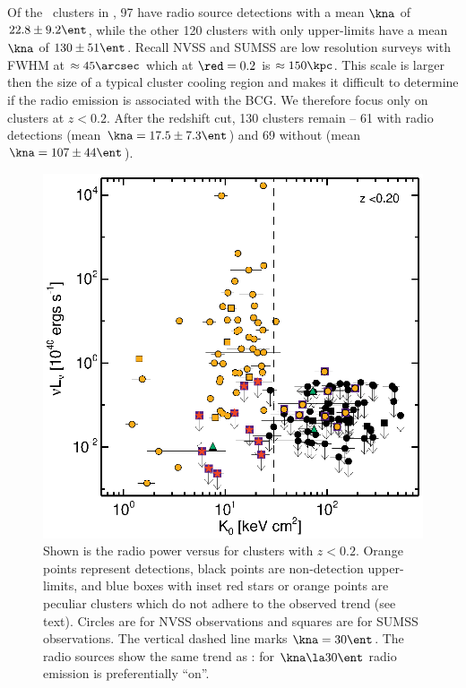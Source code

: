 \documentclass{emulateapj}
\begin{document}
Of the \clnum\ clusters in \accept, 97 have radio source detections
with a mean $\kna$ of $22.8 \pm 9.2 \ent$, while the other 120
clusters with only upper-limits have a mean $\kna$ of $130 \pm 51
\ent$. Recall NVSS and SUMSS are low resolution surveys with FWHM at
$\approx 45\arcsec$ which at $\red = 0.2$ is $\approx 150\kpc$. This
scale is larger then the size of a typical cluster cooling region and
makes it difficult to determine if the radio emission is associated
with the BCG. We therefore focus only on clusters at $z < 0.2$. After
the redshift cut, 130 clusters remain -- 61 with radio detections
(mean $\kna = 17.5 \pm 7.3 \ent$) and 69 without (mean $\kna = 107 \pm
44 \ent$).

\begin{figure}
  \begin{center}
    \includegraphics*[width=\columnwidth, trim=28mm 7mm 40mm 17mm, clip]{radio_zcut}
    \caption{Shown is the radio power versus \kna for clusters with $z
      < 0.2$. Orange points represent detections, black points are
      non-detection upper-limits, and blue boxes with inset red stars
      or orange points are peculiar clusters which do not adhere to
      the observed trend (see text). Circles are for NVSS observations
      and squares are for SUMSS observations. The vertical dashed line
      marks $\kna = 30 \ent$. The radio sources show the same trend as
      \halpha: for $\kna \la 30 \ent$ radio emission is preferentially
      ``on''.}
    \label{fig:radzcut}
  \end{center}
\end{figure}
\end{document}
